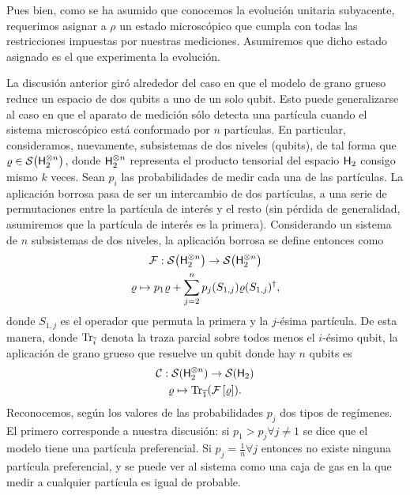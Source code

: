 Pues bien, como se ha asumido que conocemos la evolución unitaria subyacente, requerimos asignar a $\rho$ un estado microscópico que cumpla con todas las restricciones impuestas por nuestras mediciones. Asumiremos que dicho estado asignado es el que experimenta la evolución. 


La discusión anterior giró alrededor del caso en que el modelo de grano grueso reduce un espacio de dos qubits a uno de un solo qubit. Esto puede generalizarse al caso en que el aparato de medición sólo detecta una partícula cuando el sistema microscópico está conformado por $n$ partículas. En particular, consideramos, nuevamente, subsistemas de dos niveles (qubits), de tal forma que $\varrho\in\mathcal{S}\qty( {\sf H}_{2}^{\otimes n})$, donde ${\sf H}_{2}^{\otimes n}$ representa el producto tensorial del espacio ${\sf H}_{2}$ consigo mismo $k$ veces. Sean $p_{i}$ las probabilidades de medir cada una de las partículas. La aplicación borrosa pasa de ser un intercambio de dos partículas, a una serie de permutaciones entre la partícula de interés y el resto (sin pérdida de generalidad, asumiremos que la partícula de interés es la primera). Considerando un sistema de $n$ subsistemas de dos niveles, la aplicación borrosa se define entonces como
\begin{gather}
    \mathcal{F}:\mathcal{S}\qty( {\sf H}_{2}^{\otimes n})\to \mathcal{S}\qty( {\sf H}_{2}^{\otimes n})\nonumber\\
    \varrho \mapsto p_{1}\varrho+\sum_{j=2}^{n}p_{j}(S_{1,j})\varrho(S_{1,j})^{\dagger},\nonumber
\end{gather}
donde $S_{1,j}$ es el operador que permuta la primera y la $j$-ésima partícula. De esta manera, donde $\Tr_{\overline{i}}$ denota la traza parcial sobre todos menos el $i$-ésimo qubit, la aplicación de grano grueso que resuelve un qubit donde hay $n$ qubits es
\begin{gather}\label{eq:CG}
    \mathcal{C}:\mathcal{S}( {\sf H}_{2}^{\otimes n})\to \mathcal{S}({\sf H}_{2})\nonumber\\
    \varrho\mapsto\Tr_{\overline{1}}(\mathcal{F}\left[\varrho\right]).
\end{gather}
Reconocemos, según los valores de las probabilidades $p_{j}$ dos tipos de regímenes. El primero corresponde a nuestra discusión: si $p_{1}>p_{j}\forall j\neq 1$ se dice que el modelo tiene una partícula preferencial. Si $p_{j}=\frac{1}{n}\forall j$ entonces no existe ninguna partícula preferencial, y se puede ver al sistema como una caja de gas en la que medir a cualquier partícula es igual de probable.